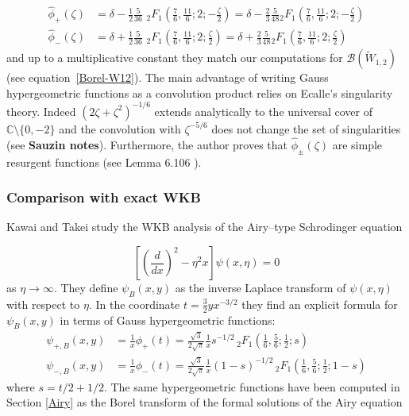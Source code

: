 \documentclass{article}
\theoremstyle{definition}
\newcommand{\C}{\mathbb{C}}
\newcommand{\borel}{\mathcal{B}}
\begin{document}
\begin{align*}
\hat{\phi}_+(\zeta)&=\delta-\frac{1}{2}\frac{5}{36}\,\, {}_2F_1\left(\frac{7}{6},\frac{11}{6};2;-\frac{\zeta}{2}\right)=\delta-\frac{2}{3}\frac{5}{48} {}_2F_1\left(\frac{7}{6},\frac{11}{6};2;-\frac{\zeta}{2}\right)\\
\hat{\phi}_-(\zeta)&=\delta+\frac{1}{2}\frac{5}{36}\,\, {}_2F_1\left(\frac{7}{6},\frac{11}{6};2;\frac{\zeta}{2}\right)=\delta+\frac{2}{3}\frac{5}{48} {}_2F_1\left(\frac{7}{6},\frac{11}{6};2;\frac{\zeta}{2}\right)
\end{align*} 
and up to a multiplicative constant they match our computations for $\borel(\tilde{W}_{1,2})$ (see equation~\eqref{Borel-W12}).
The main advantage of writing Gauss hypergeometric functions as a convolution product relies on Ecalle's singularity theory. Indeed $(2\zeta+\zeta^2)^{-1/6}$ extends analytically to the universal cover of $\C\setminus\lbrace 0,-2\rbrace$ and the convolution with $\zeta^{-5/6}$ does not change the set of singularities (see \textbf{Sauzin notes}). Furthermore, the author proves that $\hat{\phi}_{\pm}(\zeta)$ are simple resurgent functions (see Lemma 6.106 \cite{MS}). %

\subsubsection{Comparison with exact WKB}

Kawai and Takei study the WKB analysis of the Airy--type Schrodinger equation

\begin{equation}
\label{WKB_Airy} 
\left[\left(\frac{d}{dx}\right)^2 - \eta^2 x \right] \psi(x, \eta) = 0 
\end{equation}
as $\eta\to\infty$. They define $\psi_B(x, y)$ as the inverse Laplace transform of $\psi(x, \eta)$ with respect to $\eta$. In the coordinate $t=\frac{3}{2}yx^{-3/2}$ they find an explicit formula for $\psi_B(x,y)$ in terms of Gauss hypergeometric functions:
\begin{align*}
\psi_{+,B}(x,y)&=\frac{1}{x}\phi_+(t)=\frac{\sqrt{3}}{2\sqrt{\pi}}\frac{1}{x}s^{-1/2}\, {}_2F_1\left(\frac{1}{6},\frac{5}{6};\frac{1}{2};s\right)\\
\psi_{-,B}(x,y)&=\frac{1}{x}\phi_-(t)=\frac{\sqrt{3}}{2\sqrt{\pi}}\frac{1}{x}(1-s)^{-1/2}\, {}_2F_1\left(\frac{1}{6},\frac{5}{6};\frac{1}{2};1-s\right)
\end{align*}
where $s=t/2+1/2$. 
The same hypergeometric functions have been computed in Section \ref{Airy} as the Borel transform of the formal solutions of the Airy equation
\end{document}
